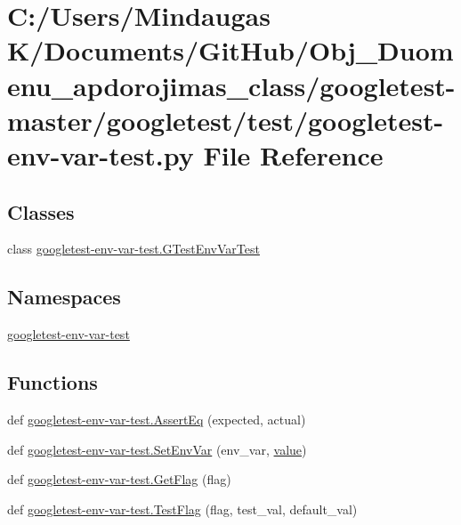\hypertarget{googletest-master_2googletest_2test_2googletest-env-var-test_8py}{}\section{C\+:/\+Users/\+Mindaugas K/\+Documents/\+Git\+Hub/\+Obj\+\_\+\+Duomenu\+\_\+apdorojimas\+\_\+class/googletest-\/master/googletest/test/googletest-\/env-\/var-\/test.py File Reference}
\label{googletest-master_2googletest_2test_2googletest-env-var-test_8py}
\subsection*{Classes}
\begin{DoxyCompactItemize}
\item 
class \mbox{\hyperlink{classgoogletest-env-var-test_1_1_g_test_env_var_test}{googletest-\/env-\/var-\/test.\+G\+Test\+Env\+Var\+Test}}
\end{DoxyCompactItemize}
\subsection*{Namespaces}
\begin{DoxyCompactItemize}
\item 
 \mbox{\hyperlink{namespacegoogletest-env-var-test}{googletest-\/env-\/var-\/test}}
\end{DoxyCompactItemize}
\subsection*{Functions}
\begin{DoxyCompactItemize}
\item 
def \mbox{\hyperlink{namespacegoogletest-env-var-test_a1dc4462bd3778a92f77f63296bb2a805}{googletest-\/env-\/var-\/test.\+Assert\+Eq}} (expected, actual)
\item 
def \mbox{\hyperlink{namespacegoogletest-env-var-test_a4445af183e70fbd62bf4903ec7447fe6}{googletest-\/env-\/var-\/test.\+Set\+Env\+Var}} (env\+\_\+var, \mbox{\hyperlink{_obj__test_2lib_2googletest-master_2googlemock_2test_2gmock-matchers__test_8cc_a337b8a670efc0b086ad3af163f3121b6}{value}})
\item 
def \mbox{\hyperlink{namespacegoogletest-env-var-test_a5e599696d970929ff7836e5329e1350f}{googletest-\/env-\/var-\/test.\+Get\+Flag}} (flag)
\item 
def \mbox{\hyperlink{namespacegoogletest-env-var-test_a7b8631f31d258198990b9a6004faa8a7}{googletest-\/env-\/var-\/test.\+Test\+Flag}} (flag, test\+\_\+val, default\+\_\+val)
\end{DoxyCompactItemize}
